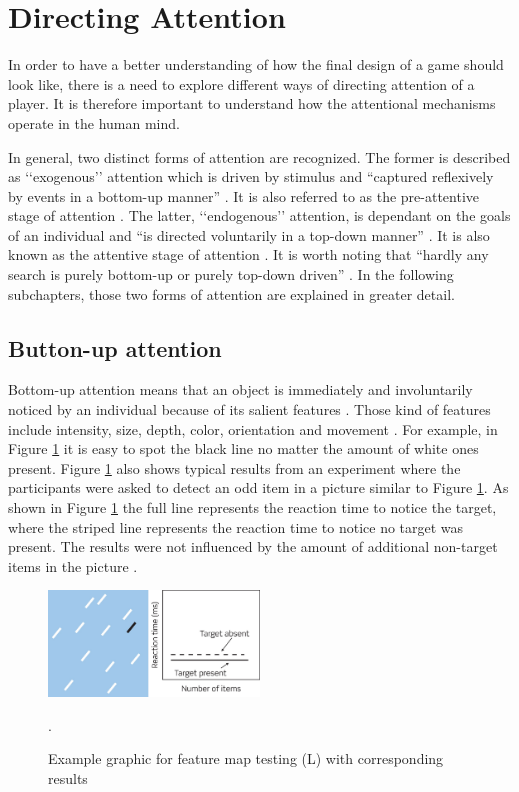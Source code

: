 \section{Directing Attention}\label{sec:direct_attention}
In order to have a better understanding of how the final design of a game should look like, there is a need to explore different ways of directing attention of a player. It is therefore important to understand how the attentional mechanisms operate in the human mind.


In general, two distinct forms of attention are recognized. The former is described as ‘‘exogenous’’ attention which is driven by stimulus and “captured reflexively by events in a bottom-up manner” \cite{lee2011efficient}. It is also referred to as the pre-attentive stage of attention \cite{zhai2008scalable}. The latter, ‘‘endogenous’’ attention, is dependant on the goals of an individual and “is directed voluntarily in a top-down manner” \cite{lee2011efficient}. It is also known as the attentive stage of attention \cite{zhai2008scalable}. It is worth noting that “hardly any search is purely bottom-up or purely top-down driven” \cite{melloni2012interaction}. In the following subchapters, those two forms of attention are explained in greater detail.

\subsection{Button-up attention}\label{subsec:buttonup attention}
Bottom-up attention means that an object is immediately and involuntarily noticed by an individual because of its salient features \cite{melloni2012interaction}. Those kind of features include intensity, size, depth, color, orientation and movement \cite{zhai2008scalable}. For example, in Figure \ref{fig:visual_search_paradign_i} it is easy to spot the black line no matter the amount of white ones present. Figure \ref{fig:visual_search_paradign_i} also shows typical results from an experiment where the participants were asked to detect an odd item in a picture similar to Figure \ref{fig:visual_search_paradign_i}. As shown in Figure \ref{fig:visual_search_paradign_i} the full line represents the reaction time to notice the target, where the striped line represents the reaction time to notice no target was present. The results were not influenced by the amount of additional non-target items in the picture \cite{snowden2012basic}.

\begin{figure}[h!]
	\centering
	\includegraphics[width=0.5\textwidth]{figures/Visual_search_paradigm_I.jpg}
	\caption{Example graphic for feature map testing (L) with corresponding results \cite{snowden2012basic}}.\label{fig:visual_search_paradign_i}
\end{figure}

